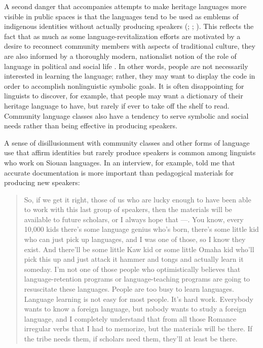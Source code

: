 \documentclass[output=paper]{LSP/langsci}
\begin{document}
A second danger that accompanies attempts to make heritage languages more visible in public spaces is that the languages tend to be used as emblems of indigenous identities without actually producing speakers (\citealt{Ahlers2006}; \citealt[98]{DauenhauerDauenhauer1998}; \citealt[715]{Whiteley2003}). This reflects the fact that as much as some language-revitalization efforts are motivated by a desire to reconnect community members with aspects of traditional culture, they are also informed by a thoroughly modern, nationalist notion of the role of language in political and social life \citep{KroskrityField2009, Nevins2013}. In other words, people are not necessarily interested in learning the language; rather, they may want to display the code in order to accomplish nonlinguistic symbolic goals. It is often disappointing for linguists to discover, for example, that people may want a dictionary of their heritage language to have, but rarely if ever to take off the shelf to read. Community language classes also have a tendency to serve symbolic and social needs rather than being effective in producing speakers. 

A sense of disillusionment with community classes and other forms of language use that affirm identities but rarely produce speakers is common among linguists who work on Siouan languages. In an interview, for example,  told me that accurate documentation is more important than pedagogical materials for producing new speakers:

\begin{quote} So, if we get it right, those of us who are lucky enough to have been able to work with this last group of speakers, then the materials will be available to future scholars, or I always hope that ---. You know, every 10,000 kids there's some language genius who's born, there's some little kid who can just pick up languages, and I was one of those, so I know they exist. And there'll be some little Kaw kid or some little Omaha kid who'll pick this up and just attack it hammer and tongs and actually learn it someday. I'm not one of those people who optimistically believes that language-retention programs or language-teaching programs are going to resuscitate these languages. People are too busy to learn languages. Language learning is not easy for most people. It's hard work. Everybody wants to know a foreign language, but nobody wants to study a foreign language, and I completely understand that from all those Romance irregular verbs that I had to memorize, but the materials will be there. If the tribe needs them, if scholars need them, they'll at least be there.\end{quote}
\end{document}
